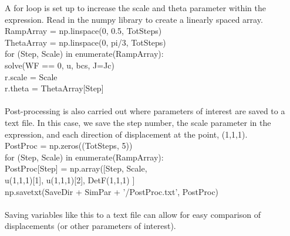 \documentclass[12pt,3p]{article}
\begin{document}
\noindent A for loop is set up to increase the {\selectfont scale} and  {\selectfont theta} parameter within the expression. Read in the {\selectfont numpy} library to create a linearly spaced array. \\
{\selectfont 
RampArray = np.linspace(0, 0.5, TotSteps) \\ 
ThetaArray = np.linspace(0, pi/3, TotSteps) \\ 
for (Step, Scale) in enumerate(RampArray): \\
\indent solve(WF == 0, u, bcs, J=Jc) \\
\indent r.scale = Scale \\
\indent r.theta = ThetaArray[Step] \\ \\
}
Post-processing is also carried out where parameters of interest are saved to a text file. In this case, we save the step number, the scale parameter in the expression, and each direction of displacement at the point, (1,1,1). \\
{\selectfont 
PostProc = np.zeros((TotSteps, 5)) \\
for (Step, Scale) in enumerate(RampArray): \\
\indent PostProc[Step] = np.array([Step, Scale, \\
\indent\indent\indent\indent\indent\indent\indent\indent\indent\indent\indent\indent
u(1,1,1)[1], u(1,1,1)[2], DetF(1,1,1) ]\\
\indent np.savetxt(SaveDir + SimPar + '/PostProc.txt', PostProc) \\ \\
}
Saving variables like this to a text file can allow for easy comparison of displacements (or other parameters of interest).

\end{document}
